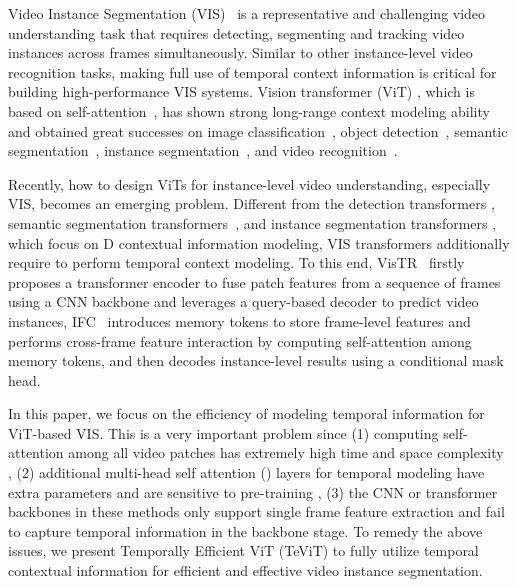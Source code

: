 \documentclass[10pt,twocolumn,letterpaper]{article}
\begin{document}
Video Instance Segmentation (VIS)~\cite{vis} is a representative and challenging video understanding task that requires detecting, segmenting and tracking video instances across frames simultaneously. Similar to other instance-level video recognition tasks, making full use of temporal context information is critical for building high-performance VIS systems. Vision transformer (ViT) \cite{vit}, which is based on self-attention~\cite{transformer}, has shown strong long-range context modeling ability and obtained great successes on image classification~\cite{vit, deit, halonet, swintransformer, pvt, msgtransformer, shuffletransformer}, object detection~\cite{detr, defdetr, conddetr, sparsercnn}, semantic segmentation~\cite{segformer, segmenter, maskformer}, instance segmentation~\cite{queryinst, solq, knet}, and video recognition~\cite{timesformer, videoswin, tokshift, vivit, vidtr, mvit, vtn}.

Recently, how to design ViTs for instance-level video understanding, especially VIS, becomes an emerging problem. Different from the detection transformers \cite{detr,defdetr,conddetr,sparsercnn, yolos}, semantic segmentation transformers~\cite{segformer, segmenter, maskformer}, and instance segmentation transformers \cite{queryinst, solq, knet}, which focus on D contextual information modeling, VIS transformers additionally require to perform temporal context modeling. To this end, VisTR~\cite{vistr} firstly proposes a transformer encoder to fuse patch features from a sequence of frames using a CNN backbone and leverages a query-based decoder to predict video instances, IFC~\cite{ifc} introduces memory tokens to store frame-level features and performs cross-frame feature interaction by computing self-attention among memory tokens, and then decodes instance-level results using a conditional mask head.

In this paper, we focus on the efficiency of modeling temporal information for ViT-based VIS. This is a very important problem since (1) computing self-attention among all video patches has extremely high time and space complexity \cite{vistr}, (2) additional multi-head self attention () layers for temporal modeling have extra parameters and are sensitive to pre-training \cite{ifc}, (3) the CNN or transformer backbones in these methods \cite{vistr, ifc, querytrack, tcis} only support single frame feature extraction and fail to capture temporal information in the backbone stage. To remedy the above issues, we present Temporally Efficient ViT (TeViT) to fully utilize temporal contextual information for efficient and effective video instance segmentation.
\end{document}
